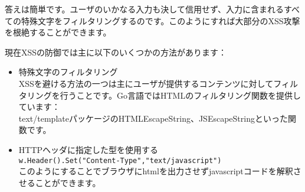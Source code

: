 答えは簡単です。ユーザのいかなる入力も決して信用せず、入力に含まれるすべての特殊文字をフィルタリングするのです。このようにすれば大部分のXSS攻撃を根絶することができます。

現在XSSの防御では主に以下のいくつかの方法があります：

\begin{itemize}
  \item 特殊文字のフィルタリング\\ XSSを避ける方法の一つは主にユーザが提供するコンテンツに対してフィルタリングを行うことです。Go言語ではHTMLのフィルタリング関数を提供しています： \\ text/templateパッケージのHTMLEscapeString、JSEscapeStringといった関数です。
  \item HTTPヘッダに指定した型を使用する\\ \texttt{w.Header().Set("Content-Type","text/javascript")}\\ このようにすることでブラウザにhtmlを出力させずjavascriptコードを解釈させることができます。
\end{itemize}

